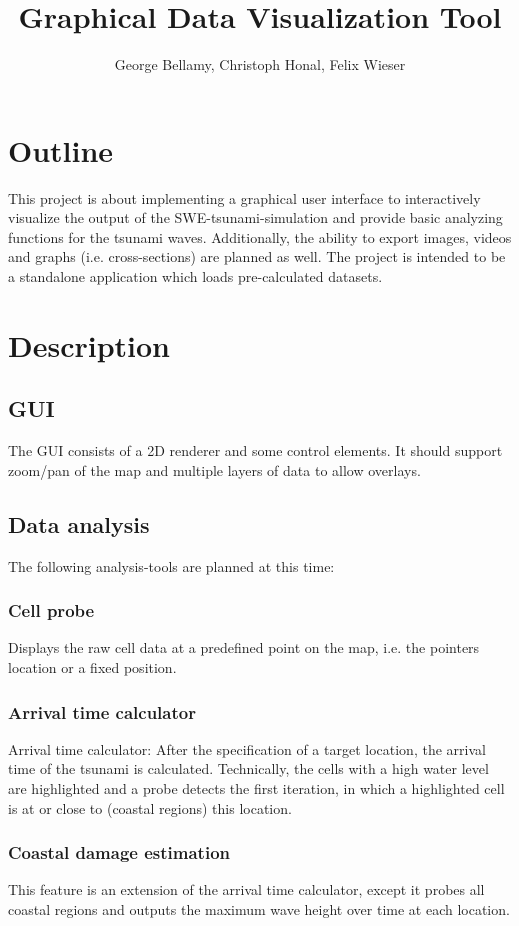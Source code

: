 \documentclass[paper=a4]{proc}
\title{Graphical Data Visualization Tool}
\author{George Bellamy, Christoph Honal, Felix Wieser}
\begin{document}
	\maketitle
	\thispagestyle{plain}	%
	\section{Outline}
		This project is about implementing a graphical user interface to interactively visualize the output of the SWE-tsunami-simulation and provide basic analyzing functions for the tsunami waves. Additionally, the ability to export images, videos and graphs (i.e. cross-sections) are planned as well. The project is intended to be a standalone application which loads pre-calculated datasets.
	\section{Description}
		\subsection{GUI}
			The GUI consists of a 2D renderer and some control elements. It should support zoom/pan of the map and multiple layers of data to allow overlays.
 		\subsection{Data analysis}
			The following analysis-tools are planned at this time:
			\subsubsection*{Cell probe}
				Displays the raw cell data at a predefined point on the map, i.e. the pointers location or a fixed position.
			\subsubsection*{Arrival time calculator}
				Arrival time calculator: After the specification of a target location, the arrival time of the tsunami is calculated. Technically, the cells with a high water level are highlighted and a probe detects the first iteration, in which a highlighted cell is at or close to (coastal regions) this location.
			\subsubsection*{Coastal damage estimation}
				This feature is an extension of the arrival time calculator, except it probes all coastal regions and outputs the maximum wave height over time at each location.
\end{document}
